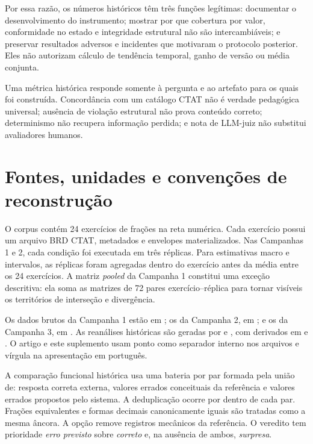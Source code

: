 \documentclass[11pt,a4paper]{article}
\begin{document}
Por essa razão, os números históricos têm três funções legítimas: documentar o desenvolvimento do instrumento; mostrar por que cobertura por valor, conformidade no estado e integridade estrutural não são intercambiáveis; e preservar resultados adversos e incidentes que motivaram o protocolo posterior. Eles não autorizam cálculo de tendência temporal, ganho de versão ou média conjunta.

\begin{tcolorbox}[colback=softblue,colframe=ruleblue,title={Regra de leitura}]
Uma métrica histórica responde somente à pergunta e ao artefato para os quais foi construída. Concordância com um catálogo CTAT não é verdade pedagógica universal; ausência de violação estrutural não prova conteúdo correto; determinismo não recupera informação perdida; e nota de LLM-juiz não substitui avaliadores humanos.
\end{tcolorbox}

\section{Fontes, unidades e convenções de reconstrução}

O corpus contém 24 exercícios de frações na reta numérica. Cada exercício possui um arquivo BRD CTAT, metadados e envelopes materializados. Nas Campanhas 1 e 2, cada condição foi executada em três réplicas. Para estimativas macro e intervalos, as réplicas foram agregadas dentro do exercício antes da média entre os 24 exercícios. A matriz \emph{pooled} da Campanha 1 constitui uma exceção descritiva: ela soma as matrizes de 72 pares exercício--réplica para tornar visíveis os territórios de interseção e divergência.

Os dados brutos da Campanha 1 estão em ; os da Campanha 2, em ; e os da Campanha 3, em . As reanálises históricas são geradas por  e , com derivados em  e . O artigo e este suplemento usam ponto como separador interno nos arquivos e vírgula na apresentação em português.

A comparação funcional histórica usa uma bateria por par formada pela união de: resposta correta externa, valores errados conceituais da referência e valores errados propostos pelo sistema. A deduplicação ocorre por  dentro de cada par. Frações equivalentes e formas decimais canonicamente iguais são tratadas como a mesma âncora. A opção  remove registros mecânicos da referência. O veredito tem prioridade \emph{erro previsto} sobre \emph{correto} e, na ausência de ambos, \emph{surpresa}.
\end{document}
